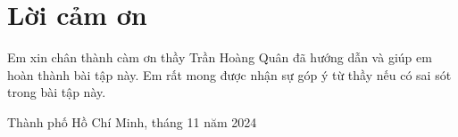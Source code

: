 \section*{Lời cảm ơn}
Em xin chân thành càm ơn thầy Trần Hoàng Quân đã hướng dẫn và giúp em hoàn thành bài tập này. Em rất mong được nhận sự góp ý từ thầy nếu có sai sót trong bài tập này.


\begin{flushright}
Thành phố Hồ Chí Minh, tháng 11 năm 2024
\end{flushright}